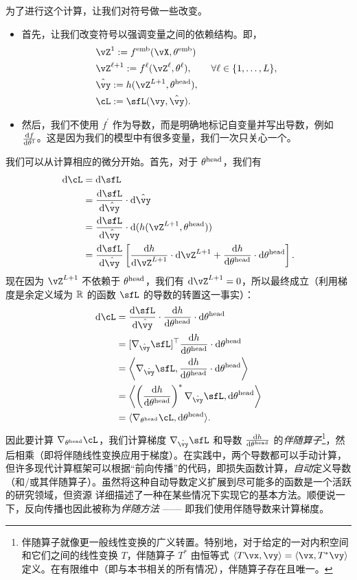\documentclass[../../book-main.tex]{subfiles}
\begin{document}
为了进行这个计算，让我们对符号做一些改变。
\begin{itemize}
    \item 首先，让我们改变符号以强调变量之间的依赖结构。即，
    \begin{align}
        &\vZ^{1} := f^{\emb}(\vX, \theta^{\emb}) \\ 
        &\vZ^{\ell + 1} := f^{\ell}(\vZ^{\ell}, \theta^{\ell}), \qquad \forall \ell \in \{1, \dots, L\}, \\
        &\hat{\vy} := h(\vZ^{L+1}, \theta^{\head}), \\ 
        &\cL := \sfL(\vy, \hat{\vy}).
    \end{align}
    \item 然后，我们不使用 \(f^{\prime}\) 作为导数，而是明确地标记自变量并写出导数，例如 \(\odv{f}{\theta^{1}}\)。这是因为我们的模型中有很多变量，我们一次只关心一个。
\end{itemize}
我们可以从计算相应的微分开始。首先，对于 \(\theta^{\mathrm{head}}\)，我们有
\begin{align}
    \odif{\cL}
    &= \odif{\sfL} \\ 
    &= \odv{\sfL}{\hat{\vy}}\cdot\odif{\hat{\vy}} \\ 
    &= \odv{\sfL}{\hat{\vy}}\cdot\odif{{(h(\vZ^{L + 1}, \theta^{\head}))}} \\ 
    &= \odv{\sfL}{\hat{\vy}}\bs{\odv{h}{\vZ^{L + 1}}\cdot\odif{\vZ}^{L + 1} + \odv{h}{\theta^{\head}}\cdot\odif{\theta}^{\head}}.
\end{align}
现在因为 \(\vZ^{L + 1}\) 不依赖于 \(\theta^{\mathrm{head}}\)，我们有 \(\odif{\vZ}^{L + 1} = 0\)，所以最终成立（利用梯度是余定义域为 \(\mathbb{R}\) 的函数 \(\sfL\) 的导数的转置这一事实）：
\begin{align}
    \odif{\cL} 
    &= \odv{\sfL}{\hat{\vy}}\cdot\odv{h}{\theta^{\head}}\cdot\odif{\theta}^{\head} \\ 
    &= [\nabla_{\hat{\vy}}\sfL]^{\top}\odv{h}{\theta^{\head}}\cdot\odif{\theta}^{\head} \\ 
    &= \ip*{\nabla_{\hat{\vy}}\sfL}{\odv{h}{\theta^{\head}}\cdot\odif{\theta}^{\head}} \\
    &= \ip*{\bp{\odv{h}{\theta^{\head}}}^{*}\nabla_{\hat{\vy}}\sfL}{\odif{\theta}^{\head}} \\ 
    &= \ip{\nabla_{\theta^{\head}}\cL}{\odif{\theta}^{\head}}.
\end{align}
因此要计算 \(\nabla_{\theta^{\head}}\cL\)，我们计算梯度 \(\nabla_{\hat{\vy}}\sfL\) 和导数 \(\odv{h}{\theta^{\head}}\) 的\textit{伴随算子}\footnote{伴随算子就像更一般线性变换的广义转置。特别地，对于给定的一对内积空间和它们之间的线性变换 \(T\)，伴随算子 \(T^{*}\) 由恒等式 \(\ip{T\vx}{\vy} = \ip{\vx}{T^{*}\vy}\) 定义。在有限维中（即与本书相关的所有情况），伴随算子存在且唯一。}，然后相乘（即将伴随线性变换应用于梯度）。在实践中，两个导数都可以手动计算，但许多现代计算框架可以根据“前向传播”的代码，即损失函数计算，\textit{自动}定义导数（和/或其伴随算子）。虽然将这种自动导数定义扩展到尽可能多的函数是一个活跃的研究领域，但资源 \cite{bright2025matrix} 详细描述了一种在某些情况下实现它的基本方法。顺便说一下，反向传播也因此被称为\textit{伴随方法} —— 即我们使用伴随导数来计算梯度。
\end{document}
